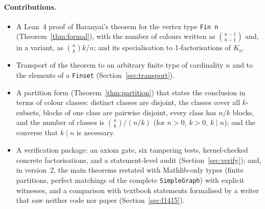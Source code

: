 \documentclass[11pt]{article}
\theoremstyle{definition}
\theoremstyle{remark}
\newcommand{\lean}[1]{\texttt{#1}}
\begin{document}
\paragraph{Contributions.}
\begin{itemize}
\item A Lean~4 proof of Baranyai's theorem for the vertex type \lean{Fin n}
(Theorem~\ref{thm:formal}), with the number of colours written as $\binom{n-1}{k-1}$ and, in a
variant, as $\binom nk k/n$; and its specialisation to 1-factorisations of $K_n$.
\item Transport of the theorem to an arbitrary finite type of cardinality $n$ and to the elements
of a \lean{Finset} (Section~\ref{sec:transport}).
\item A partition form (Theorem~\ref{thm:partition}) that states the conclusion in terms of colour
classes: distinct classes are disjoint, the classes cover all $k$-subsets, blocks of one class are
pairwise disjoint, every class has $n/k$ blocks, and the number of classes is $\binom nk/(n/k)$
(for $n>0$, $k>0$, $k\mid n$); and the converse that $k\mid n$ is necessary.
\item A verification package: an axiom gate, six tampering tests, kernel-checked concrete
factorisations, and a statement-level audit (Section~\ref{sec:verify}); and, in version~2, the main
theorems restated with Mathlib-only types (finite partitions, perfect matchings of the complete
\lean{SimpleGraph}) with explicit witnesses, and a comparison with textbook statements formalised by a
writer that saw neither code nor paper (Section~\ref{sec:l1415}).
\end{itemize}
\end{document}
